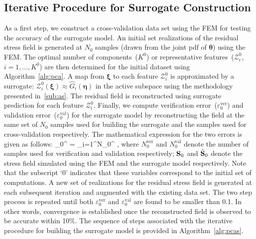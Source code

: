 \subsection{Iterative Procedure for Surrogate Construction}
\label{sub:pcas}

As a first step, we construct a cross-validation data set using the FEM
 for testing the accuracy of the surrogate model. 
An initial set realizations of the residual stress field is generated at $N_0$ samples 
(drawn from the joint pdf of $\bm{\theta}$) using the FEM. 
The optimal number of components~($K^0$) or representative features~($\mathcal{Z}_i^0$, $i=1,\ldots,K^0$)
are then determined for
the initial dataset using Algorithm~\ref{alg:pca}. A map from $\bm{\xi}$ to each feature $\mathcal{Z}_i^0$
is approximated by a surrogate: $\mathcal{Z}_i^0(\bm{\xi})\approx 
\hat{G}_i(\bm{\eta})$ in the active subspace using
the methodology presented in~\ref{sub:as}. The residual field is reconstructed using surrogate 
prediction for each feature $\mathcal{Z}_i^0$. Finally, we compute verification error~($\varepsilon_0^{\text{ver}}$)
and validation error~($\varepsilon_0^{\text{val}}$)
for the surrogate model by reconstructing the field at the same set of $N_0$
samples used for building the surrogate and the samples used for cross-validation respectively. 
The mathematical expression for the two errors is given as
follows:
%
\be
\varepsilon_0^{} = 
\sum\limits_{i=1}^{N_0^{}} ,
\label{eq:check}
\ee
%
where $N_0^{\text{ver}}$ and $N_0^{\text{val}}$ denote the number of samples used for verification and validation
respectively; $\mathbf{{S}}_0$ and $\hat{\mathbf{{S}}}_0$ denote the stress field simulated using the FEM and the 
surrogate model respectively. Note that the subscript `0' indicates that these variables correspond to the initial set
of computations. 
A new set of realizations for the residual stress field is generated at each subsequent iteration
and augmented with the existing data set. The two step process is repeated until both $\varepsilon_0^{\text{ver}}$
and $\varepsilon_0^{\text{val}}$ are found to be smaller than 0.1. In other words, convergence is established 
once the reconstructed field is observed to be accurate within 10$\%$. 
The sequence of steps associated with the iterative procedure for building the surrogate model is provided in
Algorithm~\ref{alg:pcas}. 
%
